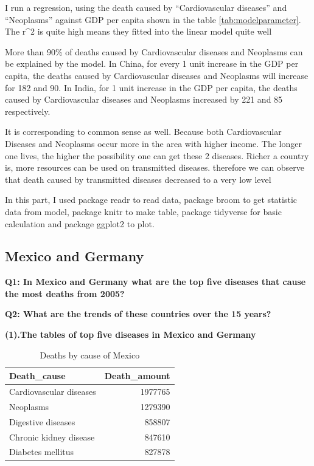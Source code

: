 \documentclass[11pt,a4paper,]{article}
\begin{document}
I run a regression, using the death caused by ``Cardiovascular diseases'' and ``Neoplasms'' against GDP per capita shown in the table \ref{tab:modelparameter}. The r\^{}2 is quite high means they fitted into the linear model quite well

More than 90\% of deaths caused by Cardiovascular diseases and Neoplasms can be explained by the model. In China, for every 1 unit increase in the GDP per capita, the deaths caused by Cardiovascular diseases and Neoplasms will increase for 182 and 90. In India, for 1 unit increase in the GDP per capita, the deaths caused by Cardiovascular diseases and Neoplasms increased by 221 and 85 respectively.

It is corresponding to common sense as well. Because both Cardiovascular Diseases and Neoplasms occur more in the area with higher income. The longer one lives, the higher the possibility one can get these 2 diseases. Richer a country is, more resources can be used on transmitted diseases. therefore we can observe that death caused by transmitted diseases decreased to a very low level

In this part, I used package readr \textcite{readr} to read data, package broom \textcite{broom} to get statistic data from model, package knitr \textcite{knitr} to make table, package tidyverse \textcite{tidyverse} for basic calculation and package ggplot2 \textcite{ggplot2} to plot.

\clearpage

\hypertarget{mexico-and-germany}{%
\subsection{Mexico and Germany}\label{mexico-and-germany}}

\textbf{Q1: In Mexico and Germany what are the top five diseases that cause the most deaths from 2005?}

\textbf{Q2: What are the trends of these countries over the 15 years?}

\textbf{(1).The tables of top five diseases in Mexico and Germany}

\begin{table}

\caption{\label{tab:Mexicotable}Deaths by cause of Mexico}
\centering
\begin{tabular}[t]{l|r}
\hline
Death\_cause & Death\_amount\\
\hline
Cardiovascular diseases & 1977765\\
\hline
Neoplasms & 1279390\\
\hline
Digestive diseases & 858807\\
\hline
Chronic kidney disease & 847610\\
\hline
Diabetes mellitus & 827878\\
\hline
\end{tabular}
\end{table}
\end{document}
